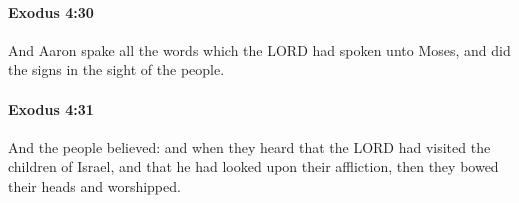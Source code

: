 		\paragraph{Exodus 4:30} %
			\label{EXODUS-4-30}

			And Aaron spake all the words which the LORD had spoken unto Moses, and did the signs in the sight of the people.


		\paragraph{Exodus 4:31} %
			\label{EXODUS-4-31}

			And the people believed: and when they heard that the LORD had visited the children of Israel, and that he had looked upon their affliction, then they bowed their heads and worshipped.

